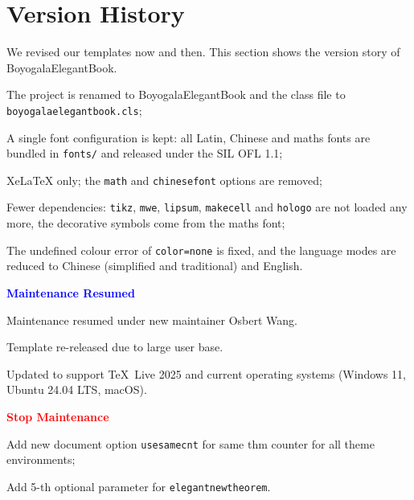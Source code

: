 \documentclass[11pt]{boyogalaelegantbook}
\begin{document}
\chapter{Version History}
We revised our templates now and then. This section shows the version story of BoyogalaElegantBook.

\begin{change}
  \item The project is renamed to BoyogalaElegantBook and the class file to \lstinline{boyogalaelegantbook.cls};
  \item A single font configuration is kept: all Latin, Chinese and maths fonts are bundled in \lstinline{fonts/} and released under the SIL OFL 1.1;
  \item XeLaTeX only; the \lstinline{math} and \lstinline{chinesefont} options are removed;
  \item Fewer dependencies: \lstinline{tikz}, \lstinline{mwe}, \lstinline{lipsum}, \lstinline{makecell} and \lstinline{hologo} are not loaded any more, the decorative symbols come from the maths font;
  \item The undefined colour error of \lstinline{color=none} is fixed, and the language modes are reduced to Chinese (simplified and traditional) and English.
\end{change}

  \textcolor{blue}{\bfseries Maintenance Resumed}

\begin{change}
  \item Maintenance resumed under new maintainer Osbert Wang.
  \item Template re-released due to large user base.
  \item Updated to support \TeX~Live 2025 and current operating systems (Windows 11, Ubuntu 24.04 LTS, macOS).
\end{change}

  \textcolor{red}{\bfseries Stop Maintenance}

\begin{change}
  \item Add new document option \lstinline|usesamecnt| for same thm counter for all theme environments;
  \item Add 5-th optional parameter for \lstinline|elegantnewtheorem|.
\end{change}
\end{document}
